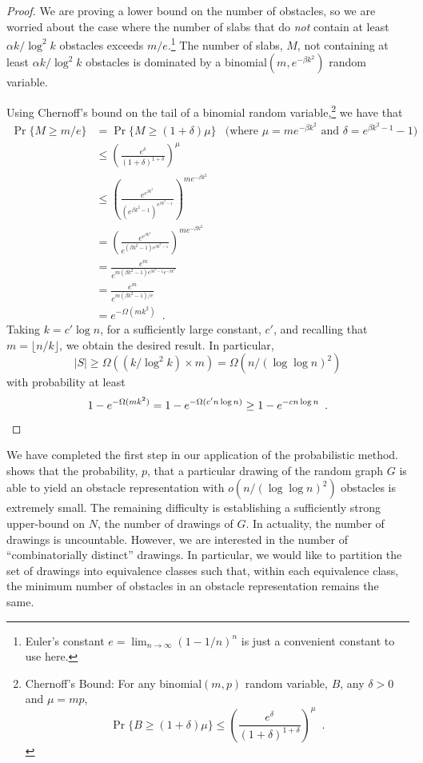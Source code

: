 \documentclass{patmorin}
\renewcommand{\note}[1]{}
\begin{document}
\begin{proof}
We are proving a lower bound on the number of obstacles, so we are
worried about the case where the number of slabs that do \emph{not}
contain at least $\alpha k/\log^2 k$ obstacles exceeds $m/e$.\footnote{Euler's constant $e=\lim_{n\rightarrow \infty} (1-1/n)^n$ is just a convenient
constant to use here.}
The number of slabs, $M$, not containing at least $\alpha k/\log^2 k$
obstacles is dominated by a binomial$(m,e^{-\beta k^2})$ random
variable.
\note{Vida asks if this is where we use E-R random graph property. Sort of---here we use that the edges within $P_i'$ are independent
of edges within $P_j'$ for $i\neq j$. (This is implicit in the claim
that there is an underlying binomial random variable.)}
Using Chernoff's bound on the tail of a binomial random
variable,\footnote{%
  Chernoff's Bound: For any binomial$(m,p)$ random variable, $B$,
  any $\delta>0$ and $\mu=mp$, 
  \[ \Pr\{B\ge (1+\delta)\mu\}
     \le \left(\frac{e^{\delta}}{(1+\delta)^{1+\delta}}\right)^{\mu} 
       \enspace . 
  \]}
we have that
\begin{align*}
  \Pr\{M \ge m/e\} & = \Pr\{M\ge (1+\delta)\mu\}
    & \text{(where $\mu=me^{-\beta k^2}$ and $\delta=e^{\beta k^2-1}-1$)} \\
    & \le \left(\frac{e^{\delta}}{(1+\delta)^{1+\delta}}\right)^{\mu} \\
    & \le \left(\frac{e^{e^{\beta k^2}}}{(e^{\beta k^2-1})^{e^{\beta k^2-1}}}\right)^{me^{-\beta k^2}}\\
    & = \left(\frac{e^{e^{\beta k^2}}}{e^{(\beta k^2-1)e^{\beta k^2-1}}}\right)^{me^{-\beta k^2}}\\
    & = \frac{e^{m}}{e^{m(\beta k^2-1)e^{\beta k^2-1}e^{-\beta k^2}}} \\
    & = \frac{e^{m}}{e^{m(\beta k^2-1)/e}} \\
    & = e^{-\Omega(mk^2)} \enspace .
\end{align*}
Taking $k=c'\log n$, for a sufficiently large constant, $c'$, and recalling that $m=\lfloor n/k\rfloor$, we obtain
the desired result.  In particular,
\[
    |S| \ge \Omega\left(\left(k/\log^2 k\right)\times m \right)
      = \Omega\left(n/(\log\log n)^2\right)
\]
with probability at least
\[
    1-e^{-\Omega(mk^2)} = 1-e^{-\Omega(c'n\log n)} \ge 1-e^{-cn\log n} \enspace . \qedhere
\]
\end{proof}

We have completed the first step in our application of the probabilistic
method.   shows that the probability, $p$, that a
particular drawing of the random graph $G$ is able to yield an obstacle
representation with $o(n/(\log\log n)^2)$ obstacles is extremely small.
The remaining difficulty is establishing a sufficiently strong upper-bound
on $N$, the number of drawings of $G$. In actuality, the number of
drawings is uncountable.  However, we are interested in the number of
``combinatorially distinct'' drawings.  In particular, we would like
to partition the set of drawings into equivalence classes such that,
within each equivalence class, the minimum number of obstacles in an
obstacle representation remains the same.
\end{document}

